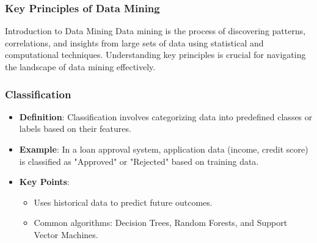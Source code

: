 \documentclass[aspectratio=169]{beamer}
\begin{document}
\begin{frame}[fragile]
    \frametitle{Key Principles of Data Mining}
    \begin{block}{Introduction to Data Mining}
        Data mining is the process of discovering patterns, correlations, and insights from large sets of data using statistical and computational techniques.
        Understanding key principles is crucial for navigating the landscape of data mining effectively.
    \end{block}
\end{frame}

\begin{frame}[fragile]
    \frametitle{Classification}
    \begin{itemize}
        \item \textbf{Definition}: Classification involves categorizing data into predefined classes or labels based on their features.
        \item \textbf{Example}: In a loan approval system, application data (income, credit score) is classified as "Approved" or "Rejected" based on training data.
        \item \textbf{Key Points}:
        \begin{itemize}
            \item Uses historical data to predict future outcomes.
            \item Common algorithms: Decision Trees, Random Forests, and Support Vector Machines.
        \end{itemize}
    \end{itemize}
\end{frame}
\end{document}
